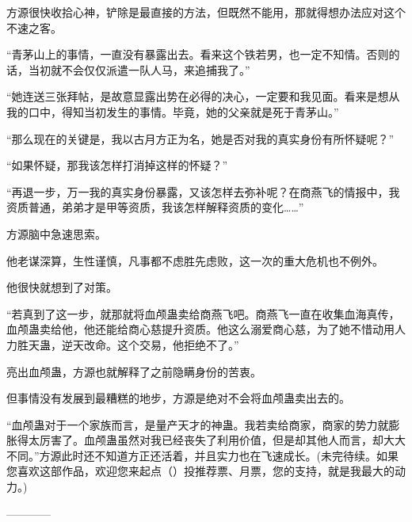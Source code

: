 \begin{this_body}
方源很快收拾心神，铲除是最直接的方法，但既然不能用，那就得想办法应对这个不速之客。

“青茅山上的事情，一直没有暴露出去。看来这个铁若男，也一定不知情。否则的话，当初就不会仅仅派遣一队人马，来追捕我了。”

“她连送三张拜帖，是故意显露出势在必得的决心，一定要和我见面。看来是想从我的口中，得知当初发生的事情。毕竟，她的父亲就是死于青茅山。”

“那么现在的关键是，我以古月方正为名，她是否对我的真实身份有所怀疑呢？”

“如果怀疑，那我该怎样打消掉这样的怀疑？”

“再退一步，万一我的真实身份暴露，又该怎样去弥补呢？在商燕飞的情报中，我资质普通，弟弟才是甲等资质，我该怎样解释资质的变化……”

方源脑中急速思索。

他老谋深算，生性谨慎，凡事都不虑胜先虑败，这一次的重大危机也不例外。

他很快就想到了对策。

“若真到了这一步，就那就将血颅蛊卖给商燕飞吧。商燕飞一直在收集血海真传，血颅蛊卖给他，他还能给商心慈提升资质。他这么溺爱商心慈，为了她不惜动用人力胜天蛊，逆天改命。这个交易，他拒绝不了。”

亮出血颅蛊，方源也就解释了之前隐瞒身份的苦衷。

但事情没有发展到最糟糕的地步，方源是绝对不会将血颅蛊卖出去的。

“血颅蛊对于一个家族而言，是量产天才的神蛊。我若卖给商家，商家的势力就膨胀得太厉害了。血颅蛊虽然对我已经丧失了利用价值，但是却其他人而言，却大大不同。”方源此时还不知道方正还活着，并且实力也在飞速成长。(未完待续。如果您喜欢这部作品，欢迎您来起点（）投推荐票、月票，您的支持，就是我最大的动力。)

------------

\end{this_body}

